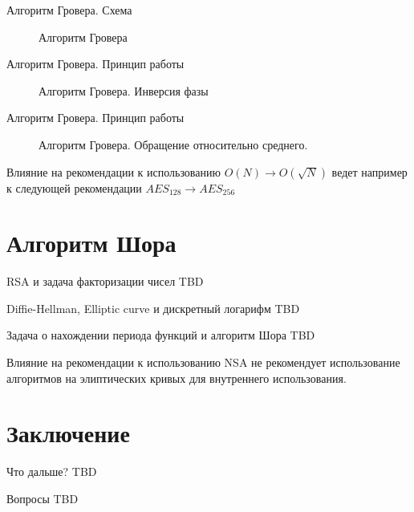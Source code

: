 \documentclass[10pt,pdf,hyperref={unicode}]{beamer}
\begin{document}
\begin{frame}{Алгоритм Гровера. Схема}
\begin{figure}
\centering



\caption{Алгоритм Гровера}
\label{figQuantCompGrover}
\end{figure}
\end{frame}


\begin{frame}{Алгоритм Гровера. Принцип работы}
\begin{figure}
\centering



\caption{Алгоритм Гровера. Инверсия фазы}
\label{figQuantCompGroverInv}
\end{figure}
\end{frame}

\begin{frame}{Алгоритм Гровера. Принцип работы}
\begin{figure}
\centering



\caption{Алгоритм Гровера. Обращение относительно
  среднего.}
\label{figQuantCompGroverInvMiddle}
\end{figure}

\end{frame}


\begin{frame}{Влияние на рекомендации к использованию}
$O(N) \rightarrow O(\sqrt{N})$
ведет например к следующей рекомендации
$AES_{128} \rightarrow AES_{256}$
\end{frame}


\section{Алгоритм Шора}
\begin{frame}{RSA и задача факторизации чисел}
TBD
\end{frame}

\begin{frame}{Diffie-Hellman, Elliptic
curve и дискретный логарифм}
TBD
\end{frame}

\begin{frame}{Задача о нахождении периода функций и алгоритм Шора}
TBD
\end{frame}

\begin{frame}{Влияние на рекомендации к использованию}
NSA не рекомендует использование алгоритмов на элиптических кривых для
внутреннего использования.
\end{frame}

\section{Заключение}
\begin{frame}{Что дальше?}
TBD
\end{frame}

\begin{frame}{Вопросы}
TBD
\end{frame}
\end{document}
